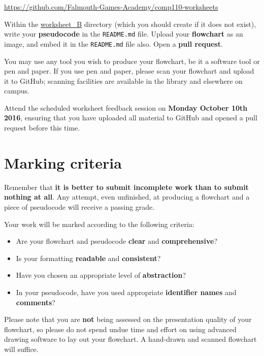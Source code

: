 \documentclass{../../../fal_assignment}
\begin{document}
\url{https://github.com/Falmouth-Games-Academy/comp110-worksheets}

Within the \url{worksheet_B} directory (which you should create if it does not exist),
write your \textbf{pseudocode} in the \texttt{README.md} file.
Upload your \textbf{flowchart} as an image, and embed it in the \texttt{README.md} file also.
Open a \textbf{pull request}.

You may use any tool you wish to produce your flowchart,
be it a software tool or pen and paper.
If you use pen and paper, please scan your flowchart and upload it to GitHub;
scanning facilities are available in the library and elsewhere on campus.

Attend the scheduled worksheet feedback session on \textbf{Monday October 10th 2016},
ensuring that you have uploaded all material to GitHub and opened a pull request before this time.

\section*{Marking criteria}

Remember that \textbf{it is better to submit incomplete work than to submit nothing at all}.
Any attempt, even unfinished, at producing a flowchart and a piece of pseudocode will receive a passing grade.

Your work will be marked according to the following criteria:
\begin{itemize}
	\item Are your flowchart and pseudocode \textbf{clear} and \textbf{comprehensive}?
	\item Is your formatting \textbf{readable} and \textbf{consistent}?
	\item Have you chosen an appropriate level of \textbf{abstraction}?
	\item In your pseudocode, have you used appropriate \textbf{identifier names} and \textbf{comments}?
\end{itemize}

Please note that you are \textbf{not} being assessed on the presentation quality of your flowchart,
so please do not spend undue time and effort on using advanced drawing software to lay out your flowchart.
A hand-drawn and scanned flowchart will suffice.
\end{document}
